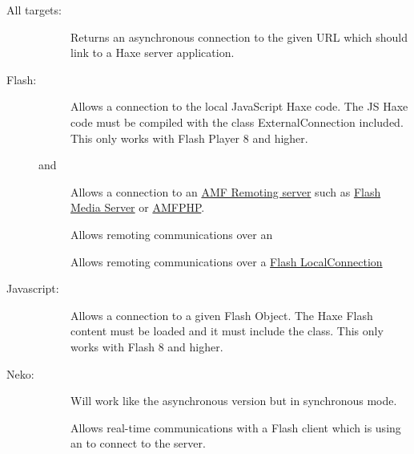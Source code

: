 \begin{description}
	\item[All targets:]
		\begin{description}
			\item[]  
				Returns an asynchronous connection to the given URL which should link to a Haxe server application. 
		\end{description}
		
	\item[Flash:]
		\begin{description}
			\item[]  
				Allows a connection to the local JavaScript Haxe code. The JS Haxe code must be compiled with the class ExternalConnection included. This only works with Flash Player 8 and higher.
			\item[ and ]  
				Allows a connection to an \href{http://en.wikipedia.org/wiki/Action_Message_Format}{AMF Remoting server} such as \href{http://www.adobe.com/products/adobe-media-server-family.html}{Flash Media Server} or \href{http://www.silexlabs.org/amfphp/}{AMFPHP}.
			\item[]  
				Allows remoting communications over an 
			\item[]  
				Allows remoting communications over a \href{http://api.haxe.org/haxe/remoting/LocalConnection.html}{Flash LocalConnection}
		\end{description}
		
	\item[Javascript:]
		\begin{description}
			\item[]  
				Allows a connection to a given Flash Object. The Haxe Flash content must be loaded and it must include the  class. This only works with Flash 8 and higher. 
		\end{description}
		
	\item[Neko:]
		\begin{description}
			\item[]  
				Will work like the asynchronous version but in synchronous mode.
			\item[]  
				Allows real-time communications with a Flash client which is using an  to connect to the server.
		\end{description}
\end{description}

